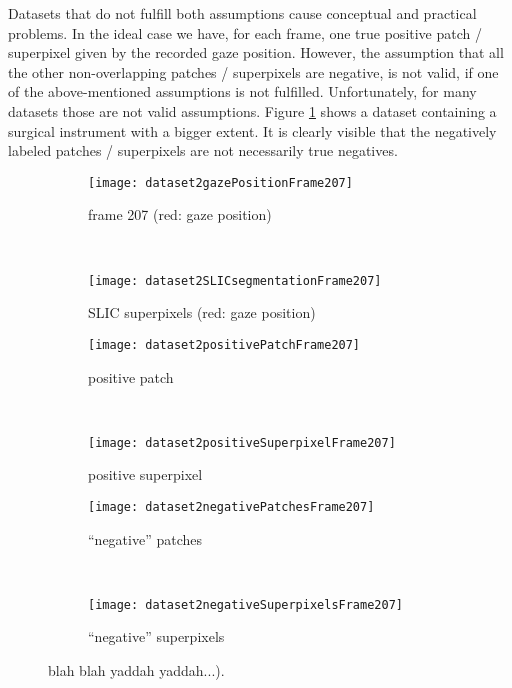 Datasets that do not fulfill both assumptions cause conceptual and practical problems. In the ideal case we have, for each frame, one true positive patch / superpixel given by the recorded gaze position. However, the assumption that all the other non-overlapping patches / superpixels are negative, is not valid, if one of the above-mentioned assumptions is not fulfilled. Unfortunately, for many datasets those are not valid assumptions. Figure \ref{fig:nonValidAssumption} shows a dataset containing a surgical instrument with a bigger extent. It is clearly visible that the negatively labeled patches / superpixels are not necessarily true negatives.



\begin{figure}[ht]
	\centering
	\begin{subfigure}[h]{0.48\textwidth}
		\texttt{[image: dataset2gazePositionFrame207]}
		\caption*{frame 207 (red: gaze position)}
	\end{subfigure}
	~
	\begin{subfigure}[h]{0.48\textwidth}
	    \texttt{[image: dataset2SLICsegmentationFrame207]}
	    \caption*{SLIC superpixels (red: gaze position)}
	\end{subfigure}
	
	\vspace{3mm}
	\begin{subfigure}[h]{0.31\textwidth}
		\texttt{[image: dataset2positivePatchFrame207]}	
		\caption*{positive patch}
	\end{subfigure}
	~
	\begin{subfigure}[h]{0.31\textwidth}
		\texttt{[image: dataset2positiveSuperpixelFrame207]}	
		\caption*{positive superpixel}
	\end{subfigure}
	
	\vspace{3mm}
		\begin{subfigure}[h]{0.48\textwidth}
		\texttt{[image: dataset2negativePatchesFrame207]}	
		\caption*{``negative'' patches}
	\end{subfigure}
	~
	\begin{subfigure}[h]{0.48\textwidth}
		\texttt{[image: dataset2negativeSuperpixelsFrame207]}	
		\caption*{``negative'' superpixels}
	\end{subfigure}	
	\caption{blah blah yaddah yaddah...). }
	\label{fig:nonValidAssumption}
\end{figure}


